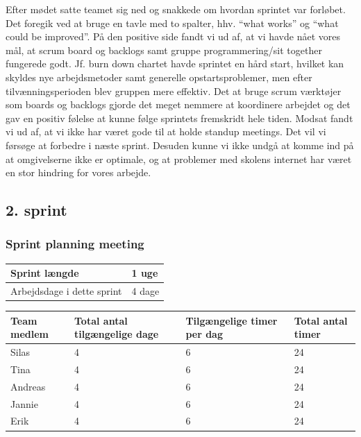 \documentclass[12pt, a4paper]{report}
\begin{document}
Efter mødet satte teamet sig ned og snakkede om hvordan sprintet var forløbet. Det foregik ved at bruge en tavle med to spalter, hhv. “what works” og “what could be improved”. På den positive side fandt vi ud af, at vi havde nået vores mål, at scrum board og backlogs samt gruppe programmering/sit together fungerede godt. Jf. burn down chartet havde sprintet en hård start, hvilket kan skyldes nye arbejdsmetoder samt generelle opstartsproblemer, men efter tilvænningsperioden blev gruppen mere effektiv. Det at bruge scrum værktøjer som boards og backlogs gjorde det meget nemmere at koordinere arbejdet og det gav en positiv følelse at kunne følge sprintets fremskridt hele tiden. Modsat fandt vi ud af, at vi ikke har været gode til at holde standup meetings. Det vil vi førsøge at forbedre i næste sprint. Desuden kunne vi ikke undgå at komme ind på at omgivelserne ikke er optimale, og at problemer med skolens internet har været en stor hindring for vores arbejde.

\subsection{2. sprint}
\subsubsection{Sprint planning meeting}

\begin{tabular}{| l | l |}

\hline
Sprint længde & 1 uge \\ \hline
Arbejdsdage i dette sprint & 4 dage \\
\hline
\end{tabular}
\newline
\vspace{1cm}
\noindent
\begin{tabular}{| p{4cm} | p{4cm} | p{4cm} | p{4cm} |}
\hline
Team medlem & Total antal tilgængelige dage & Tilgængelige timer per dag & Total antal timer \\ \hline
Silas & 4 & 6 & 24 \\ \hline
Tina & 4 & 6 & 24 \\ \hline
Andreas & 4 & 6 & 24 \\ \hline
Jannie & 4 & 6 & 24 \\ \hline
Erik & 4 & 6 & 24 \\
\hline
\end{tabular}
\newline
\end{document}
